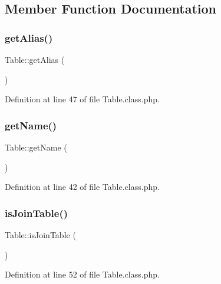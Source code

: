 \subsection{Member Function Documentation}
\mbox{\label{classTable_ad278f4d13845b8b52a4496f6c5f0e47d}} 
\subsubsection{\texorpdfstring{get\+Alias()}{getAlias()}}
{\footnotesize\ttfamily Table\+::get\+Alias (\begin{DoxyParamCaption}{ }\end{DoxyParamCaption})}



Definition at line 47 of file Table.\+class.\+php.

\mbox{\label{classTable_a8e2ad8a066449c8fedf8f3a9192db355}} 
\subsubsection{\texorpdfstring{get\+Name()}{getName()}}
{\footnotesize\ttfamily Table\+::get\+Name (\begin{DoxyParamCaption}{ }\end{DoxyParamCaption})}



Definition at line 42 of file Table.\+class.\+php.

\mbox{\label{classTable_a4d82b6895fe7a4af2ff50dddc955d075}} 
\subsubsection{\texorpdfstring{is\+Join\+Table()}{isJoinTable()}}
{\footnotesize\ttfamily Table\+::is\+Join\+Table (\begin{DoxyParamCaption}{ }\end{DoxyParamCaption})}



Definition at line 52 of file Table.\+class.\+php.

\mbox{\label{classTable_ab93dfd4a90901959b57787798162b318}} 
